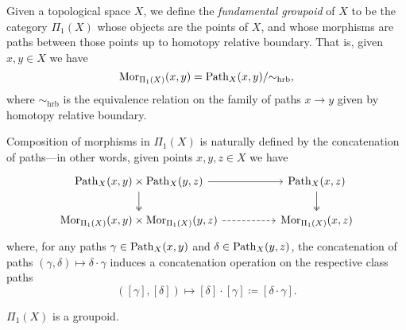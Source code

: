 \begin{definition}
\label{def:fundamental-groupoid}
Given a topological space \(X\), we define the \emph{fundamental groupoid} of
\(X\) to be the category \(\Pi_1(X)\) whose objects are the points of \(X\), and
whose morphisms are paths between those points up to homotopy relative boundary.
That is, given \(x, y \in X\) we have
\[
\operatorname{Mor}_{\Pi_1(X)}(x, y) = \operatorname{Path}_X(x, y)/{\sim_{\text{hrb}}},
\]
where \(\sim_{\text{hrb}}\) is the equivalence relation on the family of paths
\(x \to y\) given by homotopy relative boundary.

Composition of morphisms in \(\Pi_1(X)\) is naturally defined by the
concatenation of paths---in other words, given points \(x, y, z \in X\) we
have
\[
\begin{tikzcd}
{\Path_X(x, y) \times \Path_X(y, z)}
\ar[d, two heads] \ar[rr]
&&{\Path_X(x, z)} \ar[d, two heads]
\\
{\Hom_{\Pi_1(X)}(x, y) \times \Hom_{\Pi_1(X)}(y, z)}
\ar[rr, dashed]
&&{\Hom_{\Pi_1(X)}(x, z)}
\end{tikzcd}
\]
where, for any paths \(\gamma \in \operatorname{Path}_X(x, y)\) and \(\delta \in \operatorname{Path}_X(y,
z)\), the concatenation of paths \((\gamma, \delta) \mapsto \delta \cdot \gamma\) induces
a concatenation operation on the respective class paths
\[
([\gamma], [\delta]) \longmapsto
[\delta] \cdot [\gamma] \coloneq [\delta \cdot \gamma].
\]
\end{definition}

\begin{corollary}
\label{cor:Pi1-is-groupoid}
\(\Pi_1(X)\) is a groupoid.
\end{corollary}

